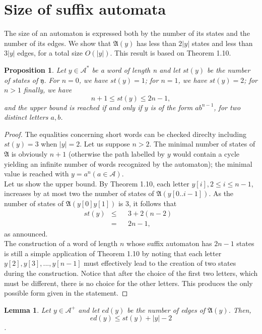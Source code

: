 \documentclass[11pt]{report}
\newtheorem{lemma}[theorem]{Lemma}
\newtheorem{proposition}[theorem]{Proposition}
\begin{document}
\section{Size of suffix automata}
The size of an automaton is expressed both by the number of its states
and the number of its edges. We show that $\mathfrak{A}(y)$ has less
than $2|y|$ states and less than $3|y|$ edges, for a total size
$O(|y|)$. This result is based on Theorem 1.10.
\begin{proposition}
  Let $y \in \mathcal{A}^*$ be a word of length n and let $st(y)$ be
  the number of states of $\mathfrak{y}$. For $n = 0$, we have $st(y)
  = 1$; for $n = 1$, we have $st(y) = 2$; for $n > 1$ finally, we
  have$$n + 1 \le st(y) \le 2n - 1,$$ and the upper bound is reached
  if and only if $y$ is of the form $ab^{n-1}$, for two distinct
  letters $a, b$.
\end{proposition}
\begin{proof}
  The equalities concerning short words can be checked direclty
  including $st(y) = 3$ when $|y| = 2$. Let us suppose $n > 2$. The
  minimal number of states of $\mathfrak{A}$ is obviously $n+1$
  (otherwise the path labelled by $y$ would contain a cycle yielding
  an infinite number of words recognized by the automaton); the
  minimal value is reached with $y = a^n (a \in \mathcal{A})$.\\
Let us show the upper bound. By Theorem 1.10, each letter $y[i], 2 \le
i \le n - 1$, increases by at most two the number of states of
$\mathfrak{A}(y[0..i-1])$. As the number of states of
$\mathfrak{A}(y[0]y[1])$ is $3$, it follows that
\begin{equation*}
  \begin{aligned}
    st(y) &\le& &3 + 2(n - 2)&\\
          &=& &2n-1,&
  \end{aligned}
\end{equation*}
as announced.\\
The construction of a word of length $n$ whose suffix automaton has
$2n-1$ states is still a simple application of Theorem 1.10 by noting
that each letter $y[2],y[3],...,y[n-1]$ must effectively lead to the
creation of two states during the construction. Notice that after the
choice of the first two letters, which must be different, there is no
choice for the other letters. This produces the only possible form
given in the statement.
\end{proof}
\begin{lemma}
  Let $y \in \mathcal{A}^+$ and let $ed(y)$ be the number of edges of
  $\mathfrak{A}(y)$. Then, $$ed(y) \le st(y) + |y| - 2$$.
\end{lemma}
\end{document}
